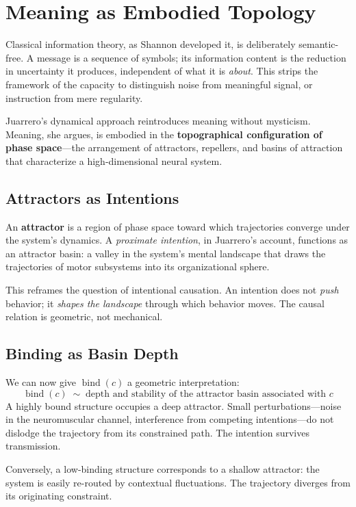 \documentclass[11pt]{article}
\newcommand{\bind}{\operatorname{bind}}
\begin{document}
\section{Meaning as Embodied Topology}

Classical information theory, as Shannon developed it, is deliberately semantic-free. A
message is a sequence of symbols; its information content is the reduction in uncertainty
it produces, independent of what it is \emph{about}. This strips the framework of the
capacity to distinguish noise from meaningful signal, or instruction from mere regularity.

Juarrero's dynamical approach reintroduces meaning without mysticism. Meaning, she argues,
is embodied in the \textbf{topographical configuration of phase space}---the arrangement of
attractors, repellers, and basins of attraction that characterize a high-dimensional neural
system.

\subsection{Attractors as Intentions}

An \textbf{attractor} is a region of phase space toward which trajectories converge under
the system's dynamics. A \emph{proximate intention}, in Juarrero's account, functions as
an attractor basin: a valley in the system's mental landscape that draws the trajectories
of motor subsystems into its organizational sphere.

This reframes the question of intentional causation. An intention does not \emph{push}
behavior; it \emph{shapes the landscape} through which behavior moves. The causal relation
is geometric, not mechanical.

\subsection{Binding as Basin Depth}

We can now give $\bind(c)$ a geometric interpretation:
\[
\bind(c) \;\sim\; \text{depth and stability of the attractor basin associated with } c
\]
A highly bound structure occupies a deep attractor. Small perturbations---noise in the
neuromuscular channel, interference from competing intentions---do not dislodge the
trajectory from its constrained path. The intention survives transmission.

Conversely, a low-binding structure corresponds to a shallow attractor: the system is
easily re-routed by contextual fluctuations. The trajectory diverges from its originating
constraint.
\end{document}
